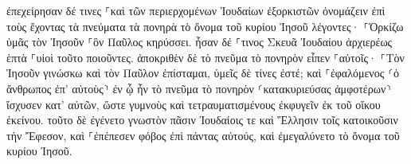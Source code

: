 \documentclass{openreader}
\begin{document}
ἐπεχείρησαν δέ τινες ⸀καὶ τῶν περιερχομένων Ἰουδαίων ἐξορκιστῶν ὀνομάζειν ἐπὶ τοὺς ἔχοντας τὰ πνεύματα τὰ πονηρὰ τὸ ὄνομα τοῦ κυρίου Ἰησοῦ λέγοντες· ⸀Ὁρκίζω ὑμᾶς τὸν Ἰησοῦν ⸀ὃν Παῦλος κηρύσσει. 
ἦσαν δέ ⸀τινος Σκευᾶ Ἰουδαίου ἀρχιερέως ἑπτὰ ⸀υἱοὶ τοῦτο ποιοῦντες. 
ἀποκριθὲν δὲ τὸ πνεῦμα τὸ πονηρὸν εἶπεν ⸀αὐτοῖς· ⸀Τὸν Ἰησοῦν γινώσκω καὶ τὸν Παῦλον ἐπίσταμαι, ὑμεῖς δὲ τίνες ἐστέ; 
καὶ ⸀ἐφαλόμενος ⸂ὁ ἄνθρωπος ἐπ’ αὐτοὺς⸃ ἐν ᾧ ἦν τὸ πνεῦμα τὸ πονηρὸν ⸂κατακυριεύσας ἀμφοτέρων⸃ ἴσχυσεν κατ’ αὐτῶν, ὥστε γυμνοὺς καὶ τετραυματισμένους ἐκφυγεῖν ἐκ τοῦ οἴκου ἐκείνου. 
τοῦτο δὲ ἐγένετο γνωστὸν πᾶσιν Ἰουδαίοις τε καὶ Ἕλλησιν τοῖς κατοικοῦσιν τὴν Ἔφεσον, καὶ ⸀ἐπέπεσεν φόβος ἐπὶ πάντας αὐτούς, καὶ ἐμεγαλύνετο τὸ ὄνομα τοῦ κυρίου Ἰησοῦ. 
\end{document}
